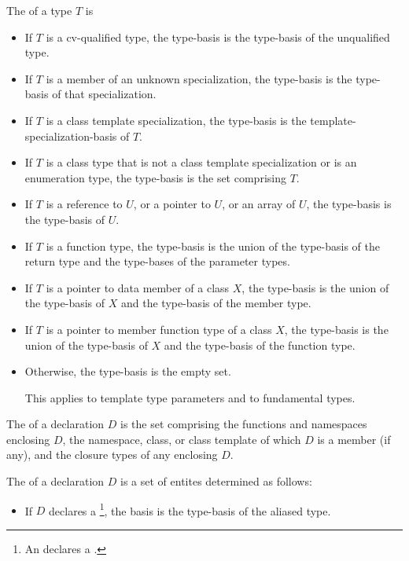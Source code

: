 \begin{std.txt}
\pnum
The  of a type $T$ is
\begin{itemize}
\item If $T$ is a cv-qualified type, the type-basis is the type-basis of
the unqualified type.
\item If $T$ is a member of an unknown specialization, the type-basis
is the type-basis of that specialization.
\item If $T$ is a class template specialization, the type-basis
is the template-specialization-basis of $T$.
\item If $T$ is a class type that is not a class template specialization
or is an enumeration type,
the type-basis is the set comprising $T$.
\item If $T$ is a reference to $U$, or a pointer to $U$, or an array of $U$, the
type-basis is the type-basis of $U$.
\item If $T$ is a function type, the type-basis is the union of the
type-basis of the return type and the type-bases of the parameter types.
\item If $T$ is a pointer to data member of a class $X$, the type-basis is
the union of the type-basis of $X$ and the type-basis of the member type.
\item If $T$ is a pointer to member function type of a class $X$, the
type-basis is the union of the type-basis of $X$ and the type-basis of
the function type.
\item Otherwise, the type-basis is the empty set.
\begin{note}
This applies to template type parameters and to fundamental types.
\end{note}
\end{itemize}

\pnum
The  of a declaration $D$ is the set comprising
the functions and namespaces enclosing $D$,
the namespace, class, or class template of which $D$ is a member (if any),
and the closure types of any  enclosing $D$.

\pnum
The  of a declaration $D$ is a set of entites determined as follows:
\begin{itemize}
\item If $D$ declares a %
\footnote{An  declares a .},
the basis is the type-basis of the aliased type.


\end{itemize}
\end{std.txt}
